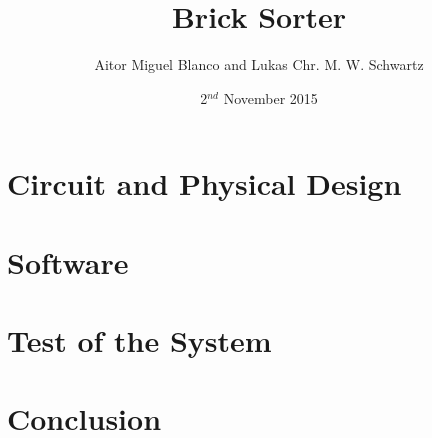 \documentclass[12pt,a4paper]{article}
\begin{document}
\title{Brick Sorter}
\date{2$^{nd}$ November 2015}
\author{Aitor Miguel Blanco and Lukas Chr. M. W. Schwartz}
\maketitle

\pagebreak

\tableofcontents

\pagebreak




\section{Circuit and Physical Design}






\section{Software}







\section{Test of the System}


\section{Conclusion}

\end{document}
